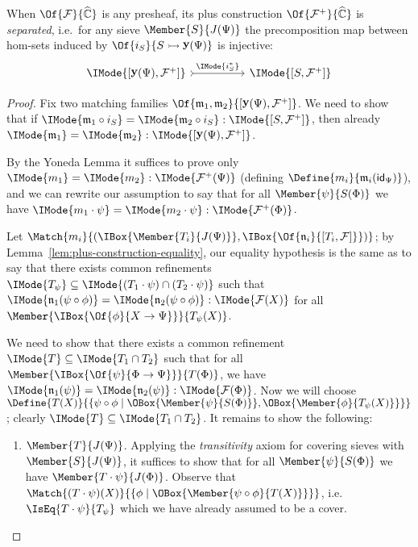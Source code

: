 \documentclass{article}
\DeclareMathOperator\OpYoneda{\mathbf{y}}
\newcommand\Yoneda[1]{\OpYoneda({#1})}
\newcommand\Psh[1]{\widehat{#1}}
\newcommand\IsSubsetEq[2]{\IMode{#1}\subseteq\IMode{#2}}
\newcommand\ArrId[1]{\mathsf{id}_{#1}}
\newcommand\Plus[1]{{#1}^+}
\newcommand\MkSet[1]{\{#1\}}
\newcommand\IsEqOf[3]{\IMode{#1}=\IMode{#2}:\IMode{#3}}
\begin{document}
\begin{thm}\label{thm:plus-separated}
  When $\Of{\mathcal{F}}{\Psh{\mathbb{C}}}$ is any presheaf, its plus
  construction $\Of{\Plus{\mathcal{F}}}{\Psh{\mathbb{C}}}$ is \emph{separated},
  i.e.\ for any sieve $\Member{S}{J(\Psi)}$ the precomposition map
  between hom-sets induced by
  $\Of{i_S}{S\rightarrowtail\Yoneda{\Psi}}$ is injective:
  \[
    \begin{tikzcd}[sep=huge]
      \IMode{[\Yoneda{\Psi},\Plus{\mathcal{F}}]}
      \arrow[r,tail,"\IMode{i_S^*}"]
      &
      \IMode{[S,\Plus{\mathcal{F}}]}
    \end{tikzcd}
  \]
\end{thm}
\begin{proof}
  Fix two matching families
  $\Of{\mathfrak{m}_1,\mathfrak{m}_2}{[\Yoneda{\Psi},\Plus{\mathcal{F}}]}$. We
  need to show that if
  $\IsEqOf{\mathfrak{m}_1\circ i_S}{\mathfrak{m}_2\circ
    i_S}{[S,\Plus{\mathcal{F}}]}$, then already
  $\IsEqOf{\mathfrak{m}_1}{\mathfrak{m}_2}{[\Yoneda{\Psi},\Plus{\mathcal{F}}]}$.
  
  By the Yoneda Lemma it suffices to prove only
  $\IsEqOf{m_1}{m_2}{\Plus{\mathcal{F}}(\Psi)}$ (defining
  $\Define{m_i}{\mathfrak{m}_i(\ArrId{\Psi})}$), and we can rewrite
  our assumption to say that for all $\Member{\psi}{S(\Phi)}$ we have
  $\IsEqOf{m_1\cdot\psi}{m_2\cdot\psi}{\Plus{\mathcal{F}}(\Phi)}$.

  Let
  $\Match{m_i}{(\IBox{\Member{T_i}{J(\Psi)}},\IBox{\Of{\mathfrak{n}_i}{[T_i,\mathcal{F}]}})}$;
  by Lemma~\ref{lem:plus-construction-equality}, our equality
  hypothesis is the same as to say that there exists common
  refinements $\IsSubsetEq{T_\psi}{(T_1\cdot\psi)\cap (T_2\cdot\psi)}$
  such that
  $\IsEqOf{\mathfrak{n}_1(\psi\circ\phi)}{\mathfrak{n}_2(\psi\circ\phi)}{\mathcal{F}(X)}$
  for all $\Member{\IBox{\Of{\phi}{X\to\Psi}}}{T_\psi(X)}$.

  We need to show that there exists a common refinement
  $\IsSubsetEq{T}{T_1\cap T_2}$ such that for all
  $\Member{\IBox{\Of{\psi}{\Phi\to\Psi}}}{T(\Phi)}$, we have
  $\IsEqOf{\mathfrak{n}_1(\psi)}{\mathfrak{n}_2(\psi)}{\mathcal{F}(\Phi)}$. Now
  we will choose
  $\Define{T(X)}{\MkSet{\psi \circ \phi \mid
      \OBox{\Member{\psi}{S(\Phi)}}, \OBox{\Member{\phi}{T_\psi(X)}}}}$;
  clearly $\IsSubsetEq{T}{T_1\cap T_2}$. It remains to show the
  following:
  \begin{enumerate}
  \item $\Member{T}{J(\Psi)}$. Applying the \emph{transitivity} axiom
    for covering sieves with $\Member{S}{J(\Psi)}$, it suffices to
    show that for all $\Member{\psi}{S(\Phi)}$ we have
    $\Member{T\cdot\psi}{J(\Phi)}$. Observe that
    $\Match{(T\cdot\psi)(X)}{\MkSet{\phi\mid
        \OBox{\Member{\psi\circ\phi}{T(X)}}}}$, i.e.\
    $\IsEq{T\cdot\psi}{T_\psi}$ which we have already assumed to be a
    cover.


\end{enumerate}
\end{proof}
\end{document}
